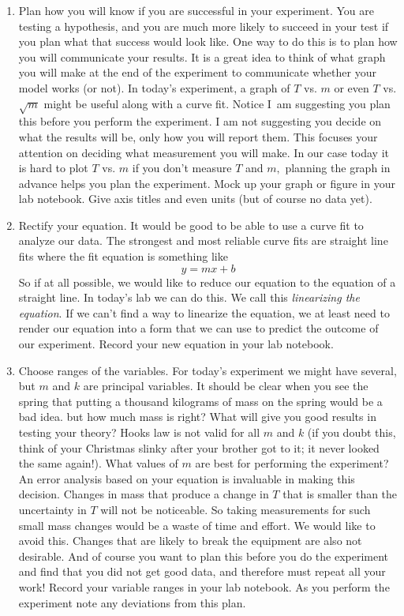 \documentclass[twoside,11pt,ShortChapTitles]{BYUTextbook}
\begin{document}
\begin{enumerate}
\item Plan how you will know if you are successful in your experiment. You are
testing a hypothesis, and you are much more likely to succeed in your test if
you plan what that success would look like. One way to do this is to plan how
you will communicate your results. It is a great idea to think of what graph
you will make at the end of the experiment to communicate whether your model
works (or not). In today's experiment, a graph of $T$ vs. $m$ or even $T$
vs.$\sqrt{m}$ might be useful along with a curve fit. Notice I\ am suggesting
you plan this before you perform the experiment. I am not suggesting you
decide on what the results will be, only how you will report them. This
focuses your attention on deciding what measurement you will make. In our case
today it is hard to plot $T$ vs. $m$ if you don't measure $T$ and $m,$
planning the graph in advance helps you plan the experiment. Mock up your
graph or figure in your lab notebook. Give axis titles and even units (but of
course no data yet).

\item Rectify your equation. It would be good to be able to use a curve fit to
analyze our data. The strongest and most reliable curve fits are straight line
fits where the fit equation is something like
\[
y=mx+b
\]
So if at all possible, we would like to reduce our equation to the equation of
a straight line. In today's lab we can do this. We call this \emph{linearizing
the equation}. If we can't find a way to linearize the equation, we at least
need to render our equation into a form that we can use to predict the outcome
of our experiment. Record your new equation in your lab notebook.

\item Choose ranges of the variables. For today's experiment we might have
several, but $m$ and $k$ are principal variables. It should be clear when you
see the spring that putting a thousand kilograms of mass on the spring would
be a bad idea. but how much mass is right? What will give you good results in
testing your theory? Hooks law is not valid for all $m$ and $k$ (if you doubt
this, think of your Christmas slinky after your brother got to it; it never
looked the same again!). What values of $m$ are best for performing the
experiment? An error analysis based on your equation is invaluable in making
this decision. Changes in mass that produce a change in $T$ that is smaller
than the uncertainty in $T$ will not be noticeable. So taking measurements for
such small mass changes would be a waste of time and effort. We would like to
avoid this. Changes that are likely to break the equipment are also not
desirable. And of course you want to plan this before you do the experiment
and find that you did not get good data, and therefore must repeat all your
work! Record your variable ranges in your lab notebook. As you perform the
experiment note any deviations from this plan.


\end{enumerate}
\end{document}
